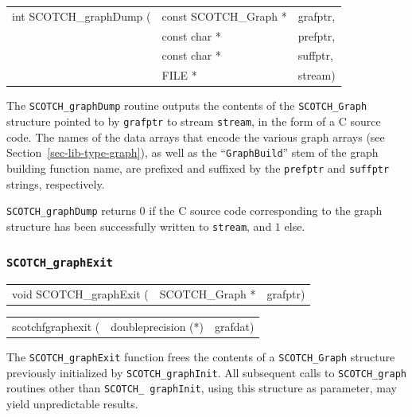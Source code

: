 \begin{itemize}
\progsyn

{\tt\begin{tabular}{l@{}ll}
int SCOTCH\_graphDump ( & const SCOTCH\_Graph * & grafptr, \\
                        & const char *          & prefptr, \\
                        & const char *          & suffptr, \\
                        & FILE *                & stream)
\end{tabular}}

\progdes

The \texttt{SCOTCH\_graphDump} routine outputs the contents of the
\texttt{SCOTCH\_\lbt Graph} structure pointed to by \texttt{grafptr}
to stream \texttt{stream}, in the form of a C source code. The names
of the data arrays that encode the various graph arrays (see
Section~\ref{sec-lib-type-graph}), as well as the
``\texttt{GraphBuild}'' stem of the graph building function name, are
prefixed and suffixed by the \texttt{prefptr} and \texttt{suffptr}
strings, respectively.

\progret

{\tt SCOTCH\_graphDump} returns $0$ if the C source code corresponding
to the graph structure has been successfully written to {\tt stream},
and $1$ else.
\end{itemize}

\subsubsection{{\tt SCOTCH\_graphExit}}

\begin{itemize}
\progsyn

{\tt\begin{tabular}{l@{}ll}
void SCOTCH\_graphExit ( & SCOTCH\_Graph * & grafptr)
\end{tabular}}

{\tt\begin{tabular}{l@{}ll}
scotchfgraphexit ( & doubleprecision (*) & grafdat)
\end{tabular}}

\progdes

The {\tt SCOTCH\_graphExit} function frees the contents of a
{\tt SCOTCH\_\lbt Graph} structure previously initialized by
{\tt SCOTCH\_\lbt graphInit}. All subsequent calls to
{\tt SCOTCH\_\lbt graph} routines other than {\tt SCOTCH\_\lbt
graphInit}, using this structure as parameter, may yield
unpredictable results.
\end{itemize}

